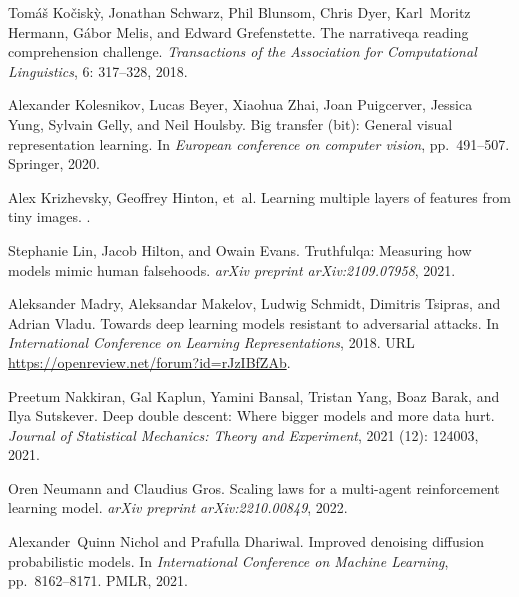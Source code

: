 \documentclass{article} %
\begin{document}
\begin{thebibliography}{62}
Tom{\'a}{\v{s}} Ko{\v{c}}isk{\`y}, Jonathan Schwarz, Phil Blunsom, Chris Dyer,
  Karl~Moritz Hermann, G{\'a}bor Melis, and Edward Grefenstette.
\newblock The narrativeqa reading comprehension challenge.
\newblock \emph{Transactions of the Association for Computational Linguistics},
  6: 317--328, 2018.

Alexander Kolesnikov, Lucas Beyer, Xiaohua Zhai, Joan Puigcerver, Jessica Yung,
  Sylvain Gelly, and Neil Houlsby.
\newblock Big transfer (bit): General visual representation learning.
\newblock In \emph{European conference on computer vision}, pp.\  491--507.
  Springer, 2020.

Alex Krizhevsky, Geoffrey Hinton, et~al.
\newblock Learning multiple layers of features from tiny images.
.

Stephanie Lin, Jacob Hilton, and Owain Evans.
\newblock Truthfulqa: Measuring how models mimic human falsehoods.
\newblock \emph{arXiv preprint arXiv:2109.07958}, 2021.

Aleksander Madry, Aleksandar Makelov, Ludwig Schmidt, Dimitris Tsipras, and
  Adrian Vladu.
\newblock Towards deep learning models resistant to adversarial attacks.
\newblock In \emph{International Conference on Learning Representations}, 2018.
\newblock URL \url{https://openreview.net/forum?id=rJzIBfZAb}.

Preetum Nakkiran, Gal Kaplun, Yamini Bansal, Tristan Yang, Boaz Barak, and Ilya
  Sutskever.
\newblock Deep double descent: Where bigger models and more data hurt.
\newblock \emph{Journal of Statistical Mechanics: Theory and Experiment},
  2021 (12): 124003, 2021.

Oren Neumann and Claudius Gros.
\newblock Scaling laws for a multi-agent reinforcement learning model.
\newblock \emph{arXiv preprint arXiv:2210.00849}, 2022.

Alexander~Quinn Nichol and Prafulla Dhariwal.
\newblock Improved denoising diffusion probabilistic models.
\newblock In \emph{International Conference on Machine Learning}, pp.\
  8162--8171. PMLR, 2021.


\end{thebibliography}
\end{document}
